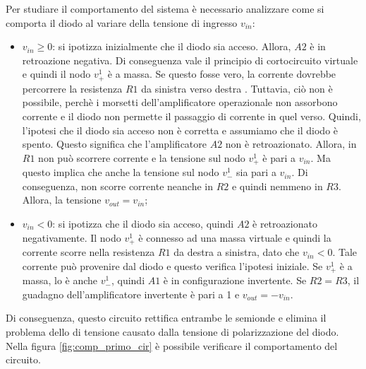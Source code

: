\noindent
Per studiare il comportamento del sistema è necessario analizzare come si comporta il diodo al variare della tensione di ingresso $v_{in}$:
\begin{itemize}
	\item $v_{in} \geq 0$: si ipotizza inizialmente che il diodo sia acceso. Allora, $A2$  è in retroazione negativa. Di conseguenza vale il principio di cortocircuito virtuale e quindi il nodo $v_{+}^1$ è a massa. Se questo fosse vero, la corrente dovrebbe percorrere la resistenza $R1$ da sinistra verso destra . Tuttavia, ciò non è possibile, perchè i morsetti dell'amplificatore operazionale non assorbono corrente e il diodo non permette il passaggio di corrente in quel verso. Quindi, l'ipotesi che il diodo sia acceso non è corretta e assumiamo che il diodo è spento. Questo significa che l'amplificatore $A2$ non è retroazionato. Allora, in $R1$ non può scorrere corrente e la tensione sul nodo $v_{+}^1$ è pari a $v_{in}$. Ma questo implica che anche la tensione sul nodo $v_{-}^1$ sia pari a $v_{in}$. Di conseguenza, non scorre corrente neanche in $R2$ e quindi nemmeno in $R3$. Allora, la tensione $v_{out} = v_{in}$;
	\item $v_{in} < 0$: si ipotizza che il diodo sia acceso, quindi $A2$ è retroazionato negativamente. Il nodo $v_{+}^1$ è connesso ad una massa virtuale e quindi la corrente scorre nella resistenza $R1$ da destra a sinistra, dato che $v_{in} < 0$. Tale corrente può provenire dal diodo e questo verifica l'ipotesi iniziale. Se $v_{+}^1$ è a massa, lo è anche $v_{-}^1$, quindi $A1$ è in configurazione invertente. Se $R2 = R3$, il guadagno dell'amplificatore invertente è pari a 1 e $v_{out} = -v_{in}$.
\end{itemize}
Di conseguenza, questo circuito rettifica entrambe le semionde e elimina il problema dello  di tensione causato dalla tensione di polarizzazione del diodo. Nella figura \ref{fig:comp_primo_cir} è possibile verificare il comportamento del circuito.

